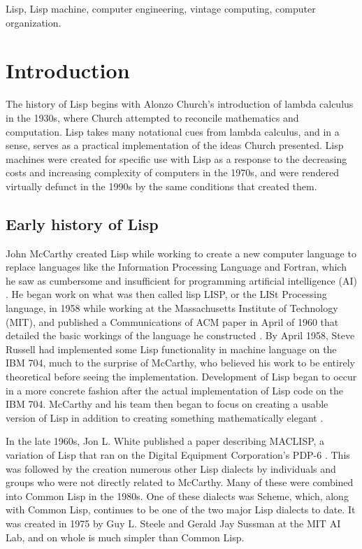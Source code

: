 \documentclass[journal]{IEEEtran}
\begin{document}
\begin{IEEEkeywords}
Lisp, Lisp machine, computer engineering, vintage computing, computer organization.
\end{IEEEkeywords}

\section{Introduction}
The history of Lisp begins with Alonzo Church's introduction of lambda calculus in the 1930s, where Church attempted to reconcile mathematics and computation. Lisp takes many notational cues from lambda calculus, and in a sense, serves as a practical implementation of the ideas Church presented. Lisp machines were created for specific use with Lisp as a response to the decreasing costs and increasing complexity of computers in the 1970s, and were rendered virtually defunct in the 1990s by the same conditions that created them. 

\subsection{Early history of Lisp}
John McCarthy created Lisp while working to create a new computer language to replace languages like the Information Processing Language and Fortran, which he saw as cumbersome and insufficient for programming artificial intelligence (AI) \cite{stoyan}. He began work on what was then called lisp LISP, or the LISt Processing language, in 1958 while working at the Massachusetts Institute of Technology (MIT), and published a Communications of ACM paper in April of 1960 that detailed the basic workings of the language he constructed \cite{stoyan, mccarthy}. By April 1958, Steve Russell had implemented some Lisp functionality in machine language on the IBM 704, much to the surprise of McCarthy, who believed his work to be entirely theoretical before seeing the implementation. Development of Lisp began to occur in a more concrete fashion after the actual implementation of Lisp code on the IBM 704. McCarthy and his team then began to focus on creating a usable version of Lisp in addition to creating something mathematically elegant \cite{stoyan}.

In the late 1960s, Jon L. White published a paper describing MACLISP, a variation of Lisp that ran on the Digital Equipment Corporation's PDP-6 \cite{stoyan}. This was followed by the creation numerous other Lisp dialects by individuals and groups who were not directly related to McCarthy. Many of these were combined into Common Lisp in the 1980s. One of these dialects was Scheme, which, along with Common Lisp, continues to be one of the two major Lisp dialects to date. It was created in 1975 by  Guy L. Steele and Gerald Jay Sussman at the MIT AI Lab, and on whole is much simpler than Common Lisp.
\end{document}
